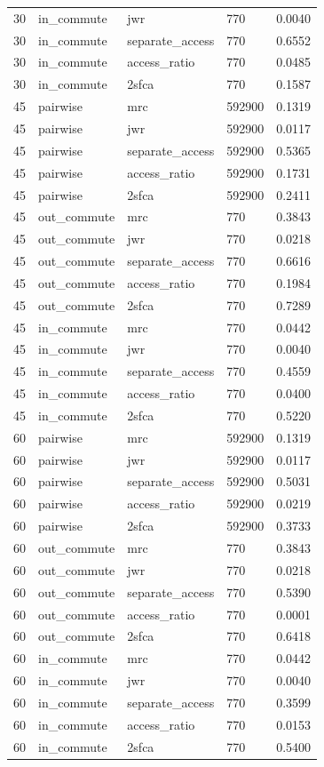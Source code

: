 \begin{table}[htbp]
\begin{tabular}{lllll}
30 & in\_commute & jwr & 770 & 0.0040 \\
30 & in\_commute & separate\_access & 770 & 0.6552 \\
30 & in\_commute & access\_ratio & 770 & 0.0485 \\
30 & in\_commute & 2sfca & 770 & 0.1587 \\
45 & pairwise & mrc & 592900 & 0.1319 \\
45 & pairwise & jwr & 592900 & 0.0117 \\
45 & pairwise & separate\_access & 592900 & 0.5365 \\
45 & pairwise & access\_ratio & 592900 & 0.1731 \\
45 & pairwise & 2sfca & 592900 & 0.2411 \\
45 & out\_commute & mrc & 770 & 0.3843 \\
45 & out\_commute & jwr & 770 & 0.0218 \\
45 & out\_commute & separate\_access & 770 & 0.6616 \\
45 & out\_commute & access\_ratio & 770 & 0.1984 \\
45 & out\_commute & 2sfca & 770 & 0.7289 \\
45 & in\_commute & mrc & 770 & 0.0442 \\
45 & in\_commute & jwr & 770 & 0.0040 \\
45 & in\_commute & separate\_access & 770 & 0.4559 \\
45 & in\_commute & access\_ratio & 770 & 0.0400 \\
45 & in\_commute & 2sfca & 770 & 0.5220 \\
60 & pairwise & mrc & 592900 & 0.1319 \\
60 & pairwise & jwr & 592900 & 0.0117 \\
60 & pairwise & separate\_access & 592900 & 0.5031 \\
60 & pairwise & access\_ratio & 592900 & 0.0219 \\
60 & pairwise & 2sfca & 592900 & 0.3733 \\
60 & out\_commute & mrc & 770 & 0.3843 \\
60 & out\_commute & jwr & 770 & 0.0218 \\
60 & out\_commute & separate\_access & 770 & 0.5390 \\
60 & out\_commute & access\_ratio & 770 & 0.0001 \\
60 & out\_commute & 2sfca & 770 & 0.6418 \\
60 & in\_commute & mrc & 770 & 0.0442 \\
60 & in\_commute & jwr & 770 & 0.0040 \\
60 & in\_commute & separate\_access & 770 & 0.3599 \\
60 & in\_commute & access\_ratio & 770 & 0.0153 \\
60 & in\_commute & 2sfca & 770 & 0.5400 \\
\bottomrule
\end{tabular}
\end{table}
